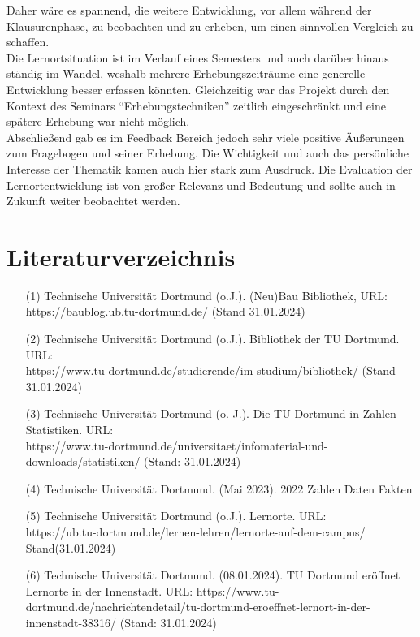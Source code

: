 \documentclass[11pt, a4paper]{article}
\begin{document}
Daher wäre es spannend, die weitere Entwicklung, vor allem während der Klausurenphase, zu beobachten und zu erheben, um einen sinnvollen Vergleich zu schaffen.\\
Die Lernortsituation ist im Verlauf eines Semesters und auch darüber hinaus ständig im Wandel, weshalb mehrere Erhebungszeiträume eine generelle Entwicklung besser erfassen könnten. Gleichzeitig war das Projekt durch den Kontext des Seminars “Erhebungstechniken” zeitlich eingeschränkt und eine spätere Erhebung war nicht möglich.\\
Abschließend gab es im Feedback Bereich jedoch sehr viele positive Äußerungen zum Fragebogen und seiner Erhebung. Die Wichtigkeit und auch das persönliche Interesse der Thematik kamen auch hier stark zum Ausdruck. Die Evaluation der Lernortentwicklung ist von großer Relevanz und Bedeutung und sollte auch in Zukunft weiter beobachtet werden.

\newpage

\section{Literaturverzeichnis}
\label{seitenverweis}
\vspace{0.5cm}
\begin{enumerate}
	
\item[(1)] Technische Universität Dortmund (o.J.). (Neu)Bau Bibliothek, URL:\\ https://baublog.ub.tu-dortmund.de/ (Stand 31.01.2024) \\

\item [(2)] Technische Universität Dortmund (o.J.). Bibliothek der TU Dortmund. URL: \\ https://www.tu-dortmund.de/studierende/im-studium/bibliothek/ (Stand 31.01.2024) \\

\item [(3)] Technische Universität Dortmund (o. J.). Die TU Dortmund in Zahlen - Statistiken. URL: \\ https://www.tu-dortmund.de/universitaet/infomaterial-und-downloads/statistiken/ (Stand: 31.01.2024) \\

\item [(4)] Technische Universität Dortmund. (Mai 2023). 2022 Zahlen Daten Fakten \\

\item [(5)] Technische Universität Dortmund (o.J.). Lernorte. URL: \\ https://ub.tu-dortmund.de/lernen-lehren/lernorte-auf-dem-campus/ Stand(31.01.2024) \\

\item [(6)] Technische Universität Dortmund. (08.01.2024). TU Dortmund eröffnet Lernorte in der Innenstadt. URL: https://www.tu-dortmund.de/nachrichtendetail/tu-dortmund-eroeffnet-lernort-in-der-innenstadt-38316/ (Stand: 31.01.2024)

\end{enumerate}
\end{document}
